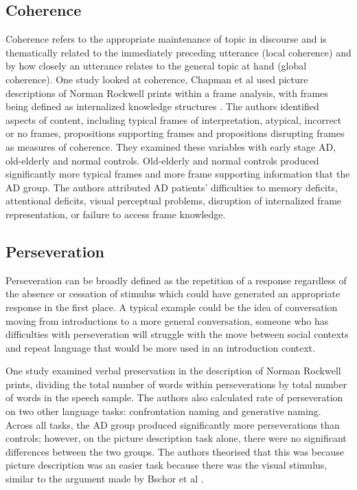 \documentclass[10pt, letterpaper, twoside, openany]{book}
\begin{document}
\subsection{Coherence}
Coherence refers to the appropriate maintenance of topic in discourse and is thematically related to the immediately preceding utterance (local coherence) and by how closely an utterance relates to the general topic at hand (global coherence). One study looked at coherence, Chapman et al used picture descriptions of Norman Rockwell prints within a frame analysis, with frames being defined as internalized knowledge structures \cite{Chapman1998}. The authors identified aspects of content, including typical frames of interpretation, atypical, incorrect or no frames, propositions supporting frames and propositions disrupting frames as measures of coherence. They examined these variables with early stage AD, old-elderly and normal controls. Old-elderly and normal controls produced significantly more typical frames and more frame supporting information that the AD group. The authors attributed AD patients' difficulties to memory deficits, attentional deficits, visual perceptual problems, disruption of internalized frame representation, or failure to access frame knowledge.
\par
\subsection{Perseveration}
Perseveration can be broadly defined as the repetition of a response regardless of the absence or cessation of stimulus which could have generated an appropriate response in the first place. A typical example could be the idea of conversation moving from introductions to a more general conversation, someone who has difficulties with perseveration will struggle with the move between social contexts and repeat language that would be more used in an introduction context.
\par 
One study examined verbal preservation in the description of Norman Rockwell prints, dividing the total number of words within perseverations by total number of words in the speech sample. The authors also calculated rate of perseveration on two other language tasks: confrontation naming and generative naming. Across all tasks, the AD group produced significantly more perseverations than controls; however, on the picture description task alone, there were no significant differences between the two groups. The authors theorised that this was because picture description was an easier task because there was the visual stimulus, similar to the argument made by Bschor et al \cite{Bschor2001}.
\par
\end{document}
